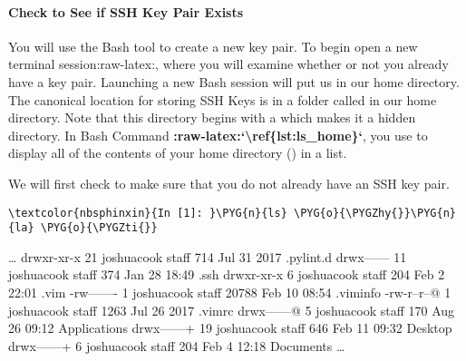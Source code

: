 \documentclass[letterpaper,10pt,english]{sphinxmanual}
\begin{document}
\paragraph{Check to See if SSH Key Pair Exists}
\label{\detokenize{01-amazon-web-services:Check-to-See-if-SSH-Key-Pair-Exists}}
You will use the Bash tool  to create a new key pair. To
begin open a new terminal
session:raw-latex:,
where you will examine whether or not you already have a key pair.
Launching a new Bash session will put us in our home directory. The
canonical location for storing SSH Keys is in a folder called 
in our home directory. Note that this directory begins with a 
which makes it a hidden directory. In Bash Command
{\color{red}\bfseries{}:raw-latex:{}`\textbackslash{}ref\{lst:ls\_home\}{}`}, you use  to display all of the
contents of your home directory (\sphinxcode{\sphinxupquote{\textasciitilde{}}}) in a list.

We will first check to make sure that you do not already have an SSH key
pair.

%
\begin{Verbatim}[commandchars=\\\{\}]
\textcolor{nbsphinxin}{In [1]: }\PYG{n}{ls} \PYG{o}{\PYGZhy{}}\PYG{n}{la} \PYG{o}{\PYGZti{}}
\end{Verbatim}



%
\begin{OriginalVerbatim}[commandchars=\\\{\}]
{\ldots}
drwxr-xr-x   21 joshuacook  staff    714 Jul 31  2017 .pylint.d
drwx------   11 joshuacook  staff    374 Jan 28 18:49 .ssh
drwxr-xr-x    6 joshuacook  staff    204 Feb  2 22:01 .vim
-rw-------    1 joshuacook  staff  20788 Feb 10 08:54 .viminfo
-rw-r--r--@   1 joshuacook  staff   1263 Jul 26  2017 .vimrc
drwx------@   5 joshuacook  staff    170 Aug 26 09:12 Applications
drwx------+  19 joshuacook  staff    646 Feb 11 09:32 Desktop
drwx------+   6 joshuacook  staff    204 Feb  4 12:18 Documents
{\ldots}
\end{OriginalVerbatim}
\relax
\end{document}
